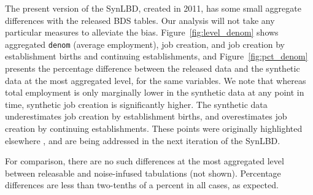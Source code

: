 The present version of the \ac{SynLBD}, created in 2011, has some small aggregate differences with the released 
\ac{BDS} tables. Our analysis will not take any particular measures to alleviate the bias. 
Figure~\ref{fig:level_denom} shows  aggregated \texttt{denom} (average employment), job 
creation, and job creation by establishment births and continuing establishments, and 
Figure~\ref{fig:pct_denom} presents the percentage difference between the released data and 
the synthetic data at the most aggregated level, for the same variables. We note that 
whereas total employment is only marginally lower in the synthetic data at any point in time, synthetic job creation is significantly higher. The 
synthetic data underestimates job creation by establishment births, and overestimates job 
creation by continuing establishments. These points were originally highlighted elsewhere 
\cite{KinneyEtAl2011}, and are being addressed in the next iteration of the \ac{SynLBD}.


%	
%
%
%


For comparison, there are no such differences at the most aggregated level between releasable and noise-infused tabulations (not shown). Percentage differences are less than two-tenths of a percent in all cases, as expected. 



